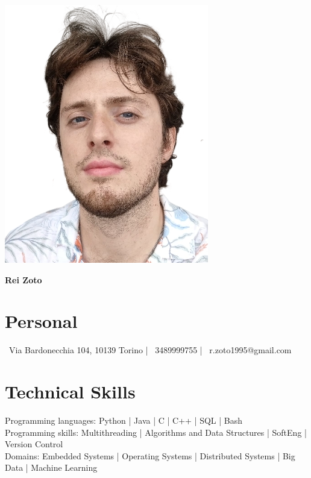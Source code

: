 \documentclass[10.5pt,a4paper]{article}
\begin{document}
\begin{minipage}{0.2\textwidth}
    \includegraphics[width=\linewidth]{propic-crop.png}
\end{minipage}
\hspace{2cm}
\begin{minipage}{0.6\textwidth}
    {\huge\bfseries Rei Zoto}
\end{minipage}

\section*{Personal}
\faMapMarker\ Via Bardonecchia 104, 10139 Torino \hspace{1em} | \hspace{1em}
\faMobile\ 3489999755 \hspace{1em} | \hspace{1em}
\faEnvelope\ r.zoto1995@gmail.com

\section*{Technical Skills}
Programming languages: Python | Java | C | C++ | SQL | Bash \\
Programming skills: Multithreading | Algorithms and Data Structures | SoftEng | Version Control \\
Domains: Embedded Systems | Operating Systems | Distributed Systems | Big Data | Machine Learning
\end{document}
